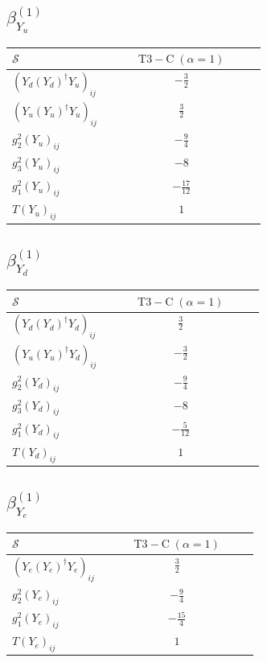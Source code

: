 \documentclass[9pt]{article}
\begin{document}
\subsection*{$ \beta_{Y_u}^{(1)} $}
\begin{longtable}{@{}p{0.38\linewidth}c@{}}
\toprule
$\mathcal{S}$ & $ \mathrm{T3-C}\;(\alpha=1) $ \\
\midrule
$ (Y_d (Y_d)^{\dagger} Y_u)_{ij} $ & $ - \frac{3}{2} $ \\
$ (Y_u (Y_u)^{\dagger} Y_u)_{ij} $ & $ \frac{3}{2} $ \\
$ g_2^2 (Y_u)_{ij} $ & $ - \frac{9}{4} $ \\
$ g_3^2 (Y_u)_{ij} $ & $ -8 $ \\
$ g_1^2 (Y_u)_{ij} $ & $ - \frac{17}{12} $ \\
$ T (Y_u)_{ij} $ & $ 1 $ \\
\bottomrule
\end{longtable}
\subsection*{$ \beta_{Y_d}^{(1)} $}
\begin{longtable}{@{}p{0.38\linewidth}c@{}}
\toprule
$\mathcal{S}$ & $ \mathrm{T3-C}\;(\alpha=1) $ \\
\midrule
$ (Y_d (Y_d)^{\dagger} Y_d)_{ij} $ & $ \frac{3}{2} $ \\
$ (Y_u (Y_u)^{\dagger} Y_d)_{ij} $ & $ - \frac{3}{2} $ \\
$ g_2^2 (Y_d)_{ij} $ & $ - \frac{9}{4} $ \\
$ g_3^2 (Y_d)_{ij} $ & $ -8 $ \\
$ g_1^2 (Y_d)_{ij} $ & $ - \frac{5}{12} $ \\
$ T (Y_d)_{ij} $ & $ 1 $ \\
\bottomrule
\end{longtable}
\subsection*{$ \beta_{Y_e}^{(1)} $}
\begin{longtable}{@{}p{0.38\linewidth}c@{}}
\toprule
$\mathcal{S}$ & $ \mathrm{T3-C}\;(\alpha=1) $ \\
\midrule
$ (Y_e (Y_e)^{\dagger} Y_e)_{ij} $ & $ \frac{3}{2} $ \\
$ g_2^2 (Y_e)_{ij} $ & $ - \frac{9}{4} $ \\
$ g_1^2 (Y_e)_{ij} $ & $ - \frac{15}{4} $ \\
$ T (Y_e)_{ij} $ & $ 1 $ \\
\bottomrule
\end{longtable}
\end{document}
